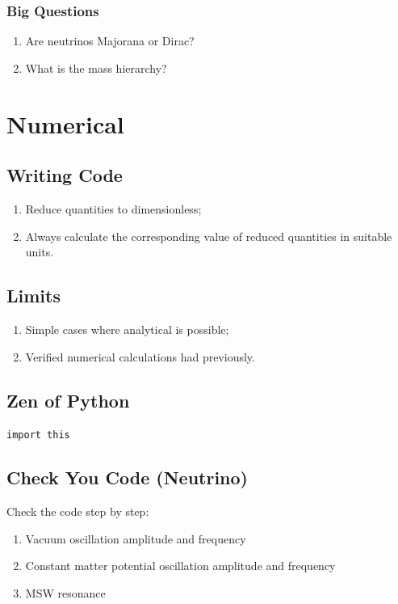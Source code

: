 \documentclass{sciposter}
\begin{document}
\begin{multicols}{3}
\subsubsection{Big Questions}

\begin{enumerate}
    \item Are neutrinos Majorana or Dirac?
    \item What is the mass hierarchy?
\end{enumerate}



\section{Numerical}

\subsection{Writing Code}


\begin{enumerate}
\item Reduce quantities to dimensionless;
\item Always calculate the corresponding value of reduced quantities in suitable units.
\end{enumerate}

\subsection{Limits}

\begin{enumerate}
\item Simple cases where analytical is possible;
\item Verified numerical calculations had previously.
\end{enumerate}



\subsection{Zen of Python}

\verb+import this+


\subsection{Check You Code (Neutrino)}
Check the code step by step:

\begin{enumerate}
\item Vacuum oscillation amplitude and frequency
\item Constant matter potential oscillation amplitude and frequency
\item MSW resonance
\end{enumerate}








\end{multicols}
\end{document}
